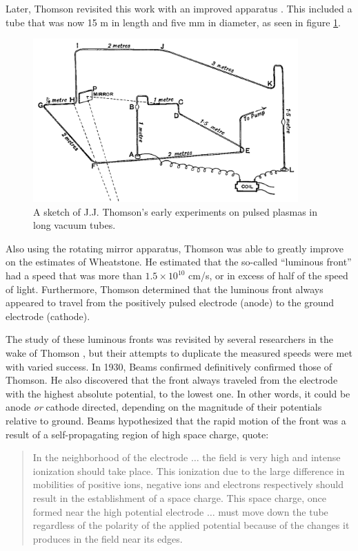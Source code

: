 Later, Thomson revisited this work with an improved apparatus
\cite{Thomson1893}. This included a tube that was now 15 m in length and five mm
in diameter, as seen in figure \ref{fig:thomson}.
\begin{figure}
  \centering
  \includegraphics[width=4in]{chapters/introduction/figures/thomson.png}
  \caption{A sketch of J.J. Thomson's early experiments on pulsed plasmas 
  in long vacuum tubes.}\label{fig:thomson}
\end{figure}
Also using the rotating mirror apparatus, Thomson was able to greatly improve on
the estimates of Wheatstone. He estimated that the so-called ``luminous front''
had a speed that was more than $1.5\times10^{10}$ cm/s, or in excess of half of
the speed of light. Furthermore, Thomson determined that the luminous front
always appeared to travel from the positively pulsed electrode (anode) to the
ground electrode (cathode).

The study of these luminous fronts was revisited by several researchers in the
wake of Thomson \cite{James1904, Whiddington1925, Beams1926}, but their attempts
to duplicate the measured speeds were met with varied success. In 1930, Beams
confirmed definitively confirmed those of Thomson. He also discovered that the
front always traveled from the electrode with the highest absolute potential, to
the lowest one. In other words, it could be anode \emph{or} cathode directed,
depending on the magnitude of their potentials relative to ground. Beams
hypothesized that the rapid motion of the front was a result of a
self-propagating region of high space charge, quote:
\begin{quote}
  In the neighborhood of the electrode $\ldots{}$ the field is very high and
  intense ionization should take place. This ionization due to the large
  difference in mobilities of positive ions, negative ions and electrons
  respectively should result in the establishment of a space charge. This space
  charge, once formed near the high potential electrode $\ldots{}$ must move
  down the tube regardless of the polarity of the applied potential because of
  the changes it produces in the field near its edges.
\end{quote}

